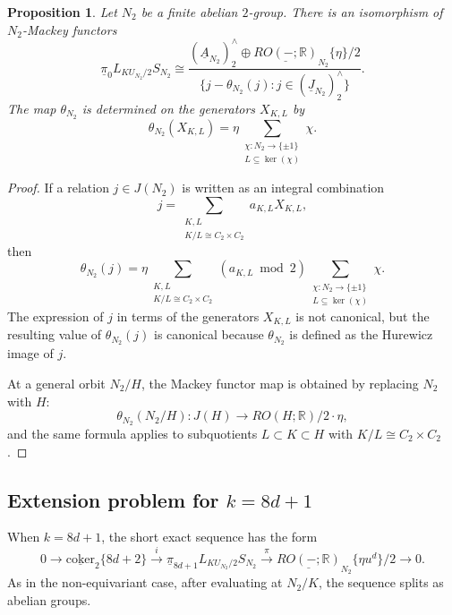 \documentclass{amsart}
\theoremstyle{plain}
\newtheorem{proposition}[theorem]{Proposition}
\theoremstyle{definition}
\theoremstyle{remark}
\begin{document}
\begin{proposition}\label{prop:extension of 2 group KU local sphere-degree-zero}
Let $N_2$ be a finite abelian $2$-group.  There is an isomorphism of $N_2$-Mackey functors
\[
  \underline{\pi}_0 L_{KU_{N_2}/2}S_{N_2}
  \cong
  \frac{(\underline{A}_{N_2})_2^\wedge \oplus \underline{RO(-;\mathbb{R})}_{N_2}\{\eta\}/2}
       {\{j-\theta_{N_2}(j):j\in (\underline{J}_{N_2})_2^\wedge\}}.
\]
The map $\theta_{N_2}$ is determined on the generators $X_{K,L}$ by
\[
  \theta_{N_2}(X_{K,L})
  =
  \eta\sum_{\substack{\chi:{N_2}\to\{\pm1\}\\ L\subseteq\ker(\chi)}}\chi.
\]
\end{proposition}
\begin{proof}
    If a relation $j\in J(N_2)$ is written as an integral combination
\[
  j=\sum_{\substack{K,L\\ K/L\cong C_2\times C_2}} a_{K,L}X_{K,L},
\]
then
\[
\theta_{N_2}(j)  =  \eta\sum_{\substack{K,L\\ K/L\cong C_2\times C_2}} (a_{K,L}\bmod 2) \sum_{\substack{\chi:{N_2}\to\{\pm1\}\\ L\subseteq\ker(\chi)}}\chi .
\]
The expression of $j$ in terms of the generators $X_{K,L}$ is not canonical, but the resulting value
of $\theta_{N_2}(j)$ is canonical because $\theta_{N_2}$ is defined as the Hurewicz image of $j$.

At a general orbit $N_2/H$, the Mackey functor map is obtained by replacing $N_2$ with $H$:
\[
  \theta_{N_2}(N_2/H):J(H)\longrightarrow RO(H;\mathbb R)/2\cdot\eta,
\]
and the same formula applies to subquotients $L\subset K\subset H$ with $K/L\cong C_2\times C_2$. 
\end{proof}

\subsection{Extension problem for $k=8d+1$}
When $k=8d+1$, the short exact sequence has the form
\[
0\longrightarrow \underline{\mathrm{coker}}_2\{8d+2\} \xrightarrow{i} \underline{\pi}_{8d+1} L_{KU_{N_2}/2}S_{N_2}\xrightarrow{\pi} \underline{RO(-;\mathbb{R})}_{N_2}\{\eta u^d\}/2\longrightarrow 0.
\]
As in the non-equivariant case, after evaluating at $N_2/K$, the sequence splits as abelian groups.
\end{document}
